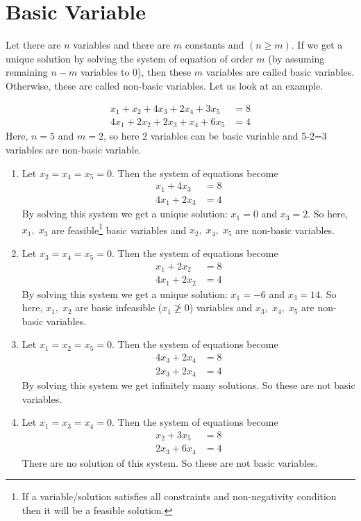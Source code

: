 \documentclass[../main-sheet.tex]{subfiles}
\begin{document}
\section{Basic Variable}
Let there are \(n\) variables and there are \(m\) constants and \((n\geq m)\). If we get a unique solution by solving the system of equation of order \(m\) (by assuming remaining \(n-m\) variables to 0), then these \(m\) variables are called basic variables. Otherwise, these are called non-basic variables. Let us look at an example.
\begin{ex}
    \begin{align*}
        x_1+x_2+4x_3+2x_4+3x_5  & =8 \\
        4x_1+2x_2+2x_3+x_4+6x_5 & =4
    \end{align*}
    Here, \(n=5\) and \(m=2\), so here 2 variables can be basic variable and 5-2=3 variables are non-basic variable.
    \begin{enumerate}[label=Case \arabic*:]
        \item \label{enum:c1}Let \(x_2=x_4=x_5=0\). Then the system of equations become
              \begin{align*}
                  x_1+4x_3  & =8 \\
                  4x_1+2x_3 & =4
              \end{align*}
              By solving this system we get a unique solution: \(x_1=0\) and \(x_3=2\). So here, \(x_1,\;x_3\) are feasible\footnote{If a variable/solution satisfies all constraints and non-negativity condition then it will be a feasible solution.} basic variables and \(x_2,\;x_4,\;x_5\) are non-basic variables.
        \item \label{enum:c2}Let \(x_3=x_4=x_5=0\). Then the system of equations become
              \begin{align*}
                  x_1+2x_2  & =8 \\
                  4x_1+2x_2 & =4
              \end{align*}
              By solving this system we get a unique solution: \(x_1=-6\) and \(x_3=14\). So here, \(x_1,\;x_2\) are basic infeasible (\(x_1\ngeq 0\)) variables and \(x_3,\;x_4,\;x_5\) are non-basic variables.
        \item Let \(x_1=x_2=x_5=0\). Then the system of equations become
              \begin{align*}
                  4x_3+2x_4 & =8 \\
                  2x_3+2x_4 & =4
              \end{align*}
              By solving this system we get infinitely many solutions. So these are not basic variables.
        \item Let \(x_1=x_3=x_4=0\). Then the system of equations become
              \begin{align*}
                  x_2+3x_5  & =8 \\
                  2x_3+6x_4 & =4
              \end{align*}
              There are no solution of this system. So these are not basic variables.
    \end{enumerate}
\end{ex}
\end{document}
